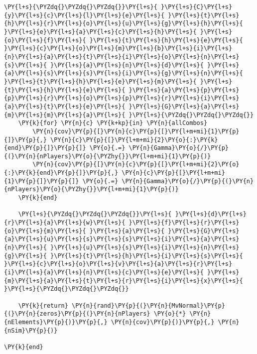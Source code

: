 \documentclass[main.tex]{subfiles}
\begin{document}
\begin{tcolorbox}[breakable, size=fbox, boxrule=1pt, pad at break*=1mm,colback=cellbackground, colframe=cellborder]
\begin{Verbatim}[commandchars=\\\{\}]
    \PY{l+s}{\PYZdq{}\PYZdq{}\PYZdq{}}\PY{l+s}{ }\PY{l+s}{C}\PY{l+s}{y}\PY{l+s}{c}\PY{l+s}{l}\PY{l+s}{e}\PY{l+s}{ }\PY{l+s}{t}\PY{l+s}{h}\PY{l+s}{r}\PY{l+s}{o}\PY{l+s}{u}\PY{l+s}{g}\PY{l+s}{h}\PY{l+s}{ }\PY{l+s}{e}\PY{l+s}{a}\PY{l+s}{c}\PY{l+s}{h}\PY{l+s}{ }\PY{l+s}{o}\PY{l+s}{f}\PY{l+s}{ }\PY{l+s}{t}\PY{l+s}{h}\PY{l+s}{e}\PY{l+s}{ }\PY{l+s}{c}\PY{l+s}{o}\PY{l+s}{m}\PY{l+s}{b}\PY{l+s}{i}\PY{l+s}{n}\PY{l+s}{a}\PY{l+s}{t}\PY{l+s}{i}\PY{l+s}{o}\PY{l+s}{n}\PY{l+s}{s}\PY{l+s}{ }\PY{l+s}{a}\PY{l+s}{n}\PY{l+s}{d}\PY{l+s}{ }\PY{l+s}{a}\PY{l+s}{s}\PY{l+s}{s}\PY{l+s}{i}\PY{l+s}{g}\PY{l+s}{n}\PY{l+s}{ }\PY{l+s}{t}\PY{l+s}{h}\PY{l+s}{e}\PY{l+s}{m}\PY{l+s}{ }\PY{l+s}{t}\PY{l+s}{h}\PY{l+s}{e}\PY{l+s}{ }\PY{l+s}{a}\PY{l+s}{p}\PY{l+s}{p}\PY{l+s}{r}\PY{l+s}{o}\PY{l+s}{p}\PY{l+s}{r}\PY{l+s}{i}\PY{l+s}{a}\PY{l+s}{t}\PY{l+s}{e}\PY{l+s}{ }\PY{l+s}{G}\PY{l+s}{a}\PY{l+s}{m}\PY{l+s}{m}\PY{l+s}{a}\PY{l+s}{ }\PY{l+s}{\PYZdq{}\PYZdq{}\PYZdq{}}
    \PY{k}{for} \PY{n}{c} \PY{k+kp}{in} \PY{n}{allCombos}
        \PY{n}{cov}\PY{p}{[}\PY{n}{c}\PY{p}{[}\PY{l+m+mi}{1}\PY{p}{]}\PY{p}{,} \PY{n}{c}\PY{p}{[}\PY{l+m+mi}{2}\PY{o}{:}\PY{k}{end}\PY{p}{]}\PY{p}{]} \PY{o}{.=} \PY{n}{Gamma}\PY{o}{/}\PY{p}{(}\PY{n}{nPlayers}\PY{o}{\PYZhy{}}\PY{l+m+mi}{1}\PY{p}{)}
        \PY{n}{cov}\PY{p}{[}\PY{n}{c}\PY{p}{[}\PY{l+m+mi}{2}\PY{o}{:}\PY{k}{end}\PY{p}{]}\PY{p}{,} \PY{n}{c}\PY{p}{[}\PY{l+m+mi}{1}\PY{p}{]}\PY{p}{]} \PY{o}{.=} \PY{n}{Gamma}\PY{o}{/}\PY{p}{(}\PY{n}{nPlayers}\PY{o}{\PYZhy{}}\PY{l+m+mi}{1}\PY{p}{)}
    \PY{k}{end}
        
    \PY{l+s}{\PYZdq{}\PYZdq{}\PYZdq{}}\PY{l+s}{ }\PY{l+s}{d}\PY{l+s}{r}\PY{l+s}{a}\PY{l+s}{w}\PY{l+s}{ }\PY{l+s}{f}\PY{l+s}{r}\PY{l+s}{o}\PY{l+s}{m}\PY{l+s}{ }\PY{l+s}{a}\PY{l+s}{ }\PY{l+s}{G}\PY{l+s}{a}\PY{l+s}{u}\PY{l+s}{s}\PY{l+s}{s}\PY{l+s}{i}\PY{l+s}{a}\PY{l+s}{n}\PY{l+s}{ }\PY{l+s}{u}\PY{l+s}{s}\PY{l+s}{i}\PY{l+s}{n}\PY{l+s}{g}\PY{l+s}{ }\PY{l+s}{t}\PY{l+s}{h}\PY{l+s}{i}\PY{l+s}{s}\PY{l+s}{ }\PY{l+s}{c}\PY{l+s}{o}\PY{l+s}{v}\PY{l+s}{a}\PY{l+s}{r}\PY{l+s}{i}\PY{l+s}{a}\PY{l+s}{n}\PY{l+s}{c}\PY{l+s}{e}\PY{l+s}{ }\PY{l+s}{m}\PY{l+s}{a}\PY{l+s}{t}\PY{l+s}{r}\PY{l+s}{i}\PY{l+s}{x}\PY{l+s}{ }\PY{l+s}{\PYZdq{}\PYZdq{}\PYZdq{}}

    \PY{k}{return} \PY{n}{rand}\PY{p}{(}\PY{n}{MvNormal}\PY{p}{(}\PY{n}{zeros}\PY{p}{(}\PY{n}{nPlayers} \PY{o}{*} \PY{n}{nElements}\PY{p}{)}\PY{p}{,} \PY{n}{cov}\PY{p}{)}\PY{p}{,} \PY{n}{nSim}\PY{p}{)}

\PY{k}{end}
\end{Verbatim}
\end{tcolorbox}
\end{document}
